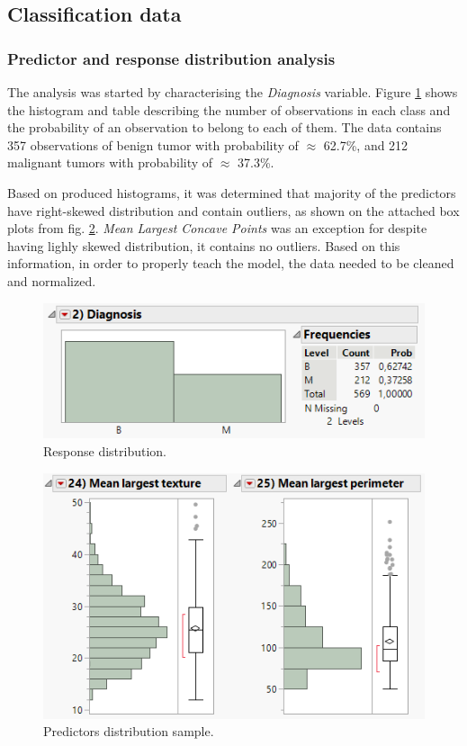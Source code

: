 	\subsection{Classification data}
	\subsubsection{Predictor and response distribution analysis}
		
	The analysis was started by characterising the \textit{Diagnosis} variable. Figure \ref{fig:diagnosisdistribution} shows the histogram and table describing the number of observations in each class and the probability of an observation to belong to each of them. The data contains 357 observations of benign tumor with probability of $\approx$ 62.7\%, and 212 malignant tumors with probability of $\approx$ 37.3\%.
		
	Based on produced histograms, it was determined that majority of the predictors have right-skewed distribution and contain outliers, as shown on the attached box plots from fig. \ref{fig:variabledistribution}. \textit{Mean Largest Concave Points} was an exception for despite having lighly skewed distribution, it contains no outliers. Based on this information, in order to properly teach the model, the data needed to be cleaned and normalized.
	
	\begin{figure}[!ht]
		\centering
		\includegraphics[width=0.6\linewidth]{Rysunki/Rozdzial2/diagnosis_distribution}
		\caption{Response distribution.}
		\label{fig:diagnosisdistribution}
	\end{figure}
	
	\begin{figure}[!ht]
		\centering
		\includegraphics[width=0.6\linewidth]{Rysunki/Rozdzial2/variable_distribution}
		\caption{Predictors distribution sample.}
		\label{fig:variabledistribution}
	\end{figure}
	
